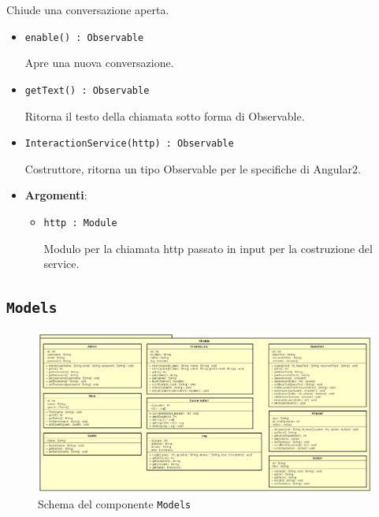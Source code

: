 \documentclass[../DefinizioneDiProdotto.tex]{subfiles}
\begin{document}
\begin{itemize}
\begin{itemize}
\begin{itemize}
	 Chiude una conversazione aperta.
	\end{itemize}\vspace{0.5em}
	\begin{itemize}
	\item \texttt{enable() : Observable}\

	 Apre una nuova conversazione.
	\end{itemize}\vspace{0.5em}
	\begin{itemize}
	\item \texttt{getText() : Observable}\

	 Ritorna il testo della chiamata sotto forma di Observable.
	\end{itemize}\vspace{0.5em}
	\begin{itemize}
	\item \texttt{InteractionService(http) : Observable}\

	 Costruttore, ritorna un tipo Observable per le specifiche di Angular2.

	\item \textbf{Argomenti}:
	\begin{itemize}
	\item \texttt{http : Module}\

	 Modulo per la chiamata http passato in input per la costruzione del service.
	\end{itemize}
	\end{itemize}\vspace{0.5em}
	\end{itemize}\end{itemize}

\subsection{ \texttt{Models}}
\begin{figure}[!h]
	\centering
	\includegraphics[width=\textwidth]{Architettura/Models.png}
	\caption{Schema del componente \texttt{Models}}
\end{figure}
\end{document}
